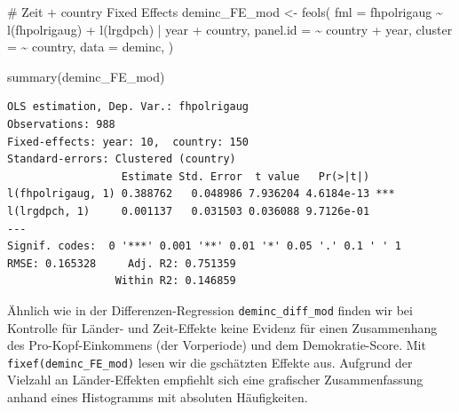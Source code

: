 \documentclass[
  a4paper,
  DIV=11,
  oneside]{scrreprt}
\newenvironment{Shaded}{\begin{snugshade}}{\end{snugshade}}
\newcommand{\AttributeTok}[1]{\textcolor[rgb]{0.40,0.45,0.13}{#1}}
\newcommand{\CommentTok}[1]{\textcolor[rgb]{0.37,0.37,0.37}{#1}}
\newcommand{\DecValTok}[1]{\textcolor[rgb]{0.68,0.00,0.00}{#1}}
\newcommand{\FunctionTok}[1]{\textcolor[rgb]{0.28,0.35,0.67}{#1}}
\newcommand{\NormalTok}[1]{\textcolor[rgb]{0.00,0.23,0.31}{#1}}
\newcommand{\OtherTok}[1]{\textcolor[rgb]{0.00,0.23,0.31}{#1}}
\newcommand{\SpecialCharTok}[1]{\textcolor[rgb]{0.37,0.37,0.37}{#1}}
\newcommand{\StringTok}[1]{\textcolor[rgb]{0.13,0.47,0.30}{#1}}
\begin{document}
\begin{Shaded}
\begin{Highlighting}[]
\CommentTok{\# Zeit + country Fixed Effects}
\NormalTok{deminc\_FE\_mod }\OtherTok{\textless{}{-}} \FunctionTok{feols}\NormalTok{(}
  \AttributeTok{fml =}\NormalTok{ fhpolrigaug }\SpecialCharTok{\textasciitilde{}} 
    \FunctionTok{l}\NormalTok{(fhpolrigaug) }
  \SpecialCharTok{+} \FunctionTok{l}\NormalTok{(lrgdpch) }
  \SpecialCharTok{|}\NormalTok{ year }\SpecialCharTok{+}\NormalTok{ country,}
  \AttributeTok{panel.id =} \SpecialCharTok{\textasciitilde{}}\NormalTok{ country }\SpecialCharTok{+}\NormalTok{ year,}
  \AttributeTok{cluster =} \SpecialCharTok{\textasciitilde{}}\NormalTok{ country,}
  \AttributeTok{data =}\NormalTok{ deminc, }
\NormalTok{)}

\FunctionTok{summary}\NormalTok{(deminc\_FE\_mod)}
\end{Highlighting}
\end{Shaded}

\begin{verbatim}
OLS estimation, Dep. Var.: fhpolrigaug
Observations: 988
Fixed-effects: year: 10,  country: 150
Standard-errors: Clustered (country) 
                  Estimate Std. Error  t value   Pr(>|t|)    
l(fhpolrigaug, 1) 0.388762   0.048986 7.936204 4.6184e-13 ***
l(lrgdpch, 1)     0.001137   0.031503 0.036088 9.7126e-01    
---
Signif. codes:  0 '***' 0.001 '**' 0.01 '*' 0.05 '.' 0.1 ' ' 1
RMSE: 0.165328     Adj. R2: 0.751359
                 Within R2: 0.146859
\end{verbatim}

Ähnlich wie in der Differenzen-Regression \texttt{deminc\_diff\_mod}
finden wir bei Kontrolle für Länder- und Zeit-Effekte keine Evidenz für
einen Zusammenhang des Pro-Kopf-Einkommens (der Vorperiode) und dem
Demokratie-Score. Mit \texttt{fixef(deminc\_FE\_mod)} lesen wir die
gschätzten Effekte aus. Aufgrund der Vielzahl an Länder-Effekten
empfiehlt sich eine grafischer Zusammenfassung anhand eines Histogramms
mit absoluten Häufigkeiten.

\begin{Shaded}
\end{Shaded}
\end{document}
